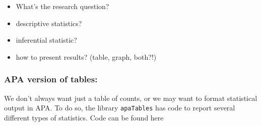 \documentclass[
]{article}
\providecommand{\tightlist}{%
  \setlength{\itemsep}{0pt}\setlength{\parskip}{0pt}}
\begin{document}
\begin{itemize}
\tightlist
\item
  What's the research question?
\item
  descriptive statistics?
\item
  inferential statistic?
\item
  how to present results? (table, graph, both?!)
\end{itemize}

\subsubsection{APA version of tables:}\label{apa-version-of-tables}

We don't always want just a table of counts, or we may want to format
statistical output in APA. To do so, the library \texttt{apaTables} has
code to report several different types of statistics. Code can be found
here
\end{document}
